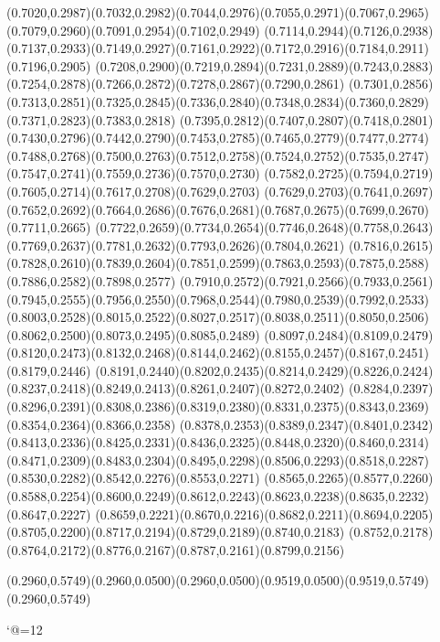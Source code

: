 (0.7020,0.2987)(0.7032,0.2982)(0.7044,0.2976)(0.7055,0.2971)(0.7067,0.2965)(0.7079,0.2960)(0.7091,0.2954)(0.7102,0.2949)
(0.7114,0.2944)(0.7126,0.2938)(0.7137,0.2933)(0.7149,0.2927)(0.7161,0.2922)(0.7172,0.2916)(0.7184,0.2911)(0.7196,0.2905)
(0.7208,0.2900)(0.7219,0.2894)(0.7231,0.2889)(0.7243,0.2883)(0.7254,0.2878)(0.7266,0.2872)(0.7278,0.2867)(0.7290,0.2861)
(0.7301,0.2856)(0.7313,0.2851)(0.7325,0.2845)(0.7336,0.2840)(0.7348,0.2834)(0.7360,0.2829)(0.7371,0.2823)(0.7383,0.2818)
(0.7395,0.2812)(0.7407,0.2807)(0.7418,0.2801)(0.7430,0.2796)(0.7442,0.2790)(0.7453,0.2785)(0.7465,0.2779)(0.7477,0.2774)
(0.7488,0.2768)(0.7500,0.2763)(0.7512,0.2758)(0.7524,0.2752)(0.7535,0.2747)(0.7547,0.2741)(0.7559,0.2736)(0.7570,0.2730)
(0.7582,0.2725)(0.7594,0.2719)(0.7605,0.2714)(0.7617,0.2708)(0.7629,0.2703)
\PST@Solid(0.7629,0.2703)(0.7641,0.2697)(0.7652,0.2692)(0.7664,0.2686)(0.7676,0.2681)(0.7687,0.2675)(0.7699,0.2670)(0.7711,0.2665)
(0.7722,0.2659)(0.7734,0.2654)(0.7746,0.2648)(0.7758,0.2643)(0.7769,0.2637)(0.7781,0.2632)(0.7793,0.2626)(0.7804,0.2621)
(0.7816,0.2615)(0.7828,0.2610)(0.7839,0.2604)(0.7851,0.2599)(0.7863,0.2593)(0.7875,0.2588)(0.7886,0.2582)(0.7898,0.2577)
(0.7910,0.2572)(0.7921,0.2566)(0.7933,0.2561)(0.7945,0.2555)(0.7956,0.2550)(0.7968,0.2544)(0.7980,0.2539)(0.7992,0.2533)
(0.8003,0.2528)(0.8015,0.2522)(0.8027,0.2517)(0.8038,0.2511)(0.8050,0.2506)(0.8062,0.2500)(0.8073,0.2495)(0.8085,0.2489)
(0.8097,0.2484)(0.8109,0.2479)(0.8120,0.2473)(0.8132,0.2468)(0.8144,0.2462)(0.8155,0.2457)(0.8167,0.2451)(0.8179,0.2446)
(0.8191,0.2440)(0.8202,0.2435)(0.8214,0.2429)(0.8226,0.2424)(0.8237,0.2418)(0.8249,0.2413)(0.8261,0.2407)(0.8272,0.2402)
(0.8284,0.2397)(0.8296,0.2391)(0.8308,0.2386)(0.8319,0.2380)(0.8331,0.2375)(0.8343,0.2369)(0.8354,0.2364)(0.8366,0.2358)
(0.8378,0.2353)(0.8389,0.2347)(0.8401,0.2342)(0.8413,0.2336)(0.8425,0.2331)(0.8436,0.2325)(0.8448,0.2320)(0.8460,0.2314)
(0.8471,0.2309)(0.8483,0.2304)(0.8495,0.2298)(0.8506,0.2293)(0.8518,0.2287)(0.8530,0.2282)(0.8542,0.2276)(0.8553,0.2271)
(0.8565,0.2265)(0.8577,0.2260)(0.8588,0.2254)(0.8600,0.2249)(0.8612,0.2243)(0.8623,0.2238)(0.8635,0.2232)(0.8647,0.2227)
(0.8659,0.2221)(0.8670,0.2216)(0.8682,0.2211)(0.8694,0.2205)(0.8705,0.2200)(0.8717,0.2194)(0.8729,0.2189)(0.8740,0.2183)
(0.8752,0.2178)(0.8764,0.2172)(0.8776,0.2167)(0.8787,0.2161)(0.8799,0.2156)



\PST@Solid(0.2960,0.5749)(0.2960,0.0500)\PST@Solid(0.2960,0.0500)(0.9519,0.0500)(0.9519,0.5749)(0.2960,0.5749)

\catcode`@=12
\fi
\endpspicture
